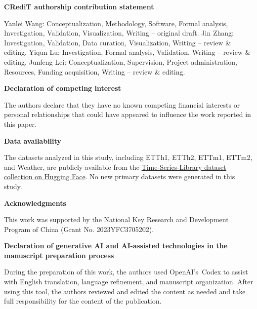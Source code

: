 \documentclass[final,5p,times,twocolumn,nopreprintline]{elsarticle}
\newcommand{\backmattersection}[1]{%
  \par\addvspace{8pt}%
  \noindent\textbf{#1}\par\smallskip}
\begin{document}


\backmattersection{CRediT authorship contribution statement}
Yanlei Wang: Conceptualization, Methodology, Software, Formal analysis,
Investigation, Validation, Visualization, Writing -- original draft. Jin Zhang:
Investigation, Validation, Data curation, Visualization, Writing -- review \&
editing. Yiqun Lu: Investigation, Formal analysis, Validation, Writing -- review
\& editing. Junfeng Lei: Conceptualization, Supervision, Project administration,
Resources, Funding acquisition, Writing -- review \& editing.

\backmattersection{Declaration of competing interest}
The authors declare that they have no known competing financial interests or
personal relationships that could have appeared to influence the work reported
in this paper.

\backmattersection{Data availability}
The datasets analyzed in this study, including ETTh1, ETTh2, ETTm1, ETTm2,
and Weather, are publicly available from the
\href{https://huggingface.co/datasets/thuml/Time-Series-Library}{Time-Series-Library
dataset collection on Hugging Face}. No new primary datasets were generated in
this study.

\backmattersection{Acknowledgments}
\begingroup
\raggedright
This work was supported by the National Key Research and Development Program of
China (Grant No. 2023YFC3705202).\par
\endgroup

\backmattersection{Declaration of generative AI and AI-assisted technologies in the manuscript preparation process}
During the preparation of this work, the authors used \mbox{OpenAI's Codex} to assist
with English translation, language refinement, and manuscript organization.
After using this tool, the authors reviewed and edited the content as needed and
take full responsibility for the content of the publication.



\end{document}
